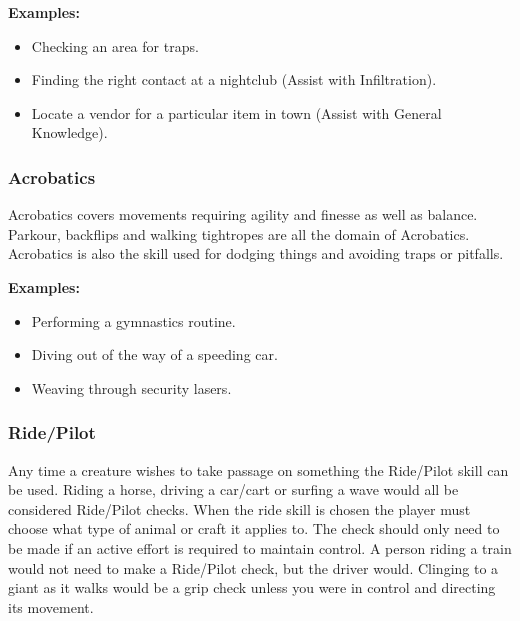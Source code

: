 \begin{displayquote}
    \textbf{Examples:}
    \begin{itemize}
        \item Checking an area for traps.
        \item Finding the right contact at a nightclub (Assist with Infiltration).
        \item Locate a vendor for a particular item in town (Assist with General Knowledge).
    \end{itemize}
\end{displayquote}

\subsubsection{Acrobatics} \label{subsubsec:acrobatics}

Acrobatics covers movements requiring agility and finesse as well as balance. Parkour, backflips and walking tightropes are all the domain of Acrobatics. Acrobatics is also the skill used for dodging things and avoiding traps or pitfalls.

\begin{displayquote}
    \textbf{Examples:}
    \begin{itemize}
        \item Performing a gymnastics routine.
        \item Diving out of the way of a speeding car.
        \item Weaving through security lasers.
    \end{itemize}
\end{displayquote}

\subsubsection{Ride/Pilot} \label{subsubsec:ride_pilot}

Any time a creature wishes to take passage on something the Ride/Pilot skill can be used. Riding a horse, driving a car/cart or surfing a wave would all be considered Ride/Pilot checks. When the ride skill is chosen the player must choose what type of animal or craft it applies to. The check should only need to be made if an active effort is required to maintain control. A person riding a train would not need to make a Ride/Pilot check, but the driver would. Clinging to a giant as it walks would be a grip check unless you were in control and directing its movement.

